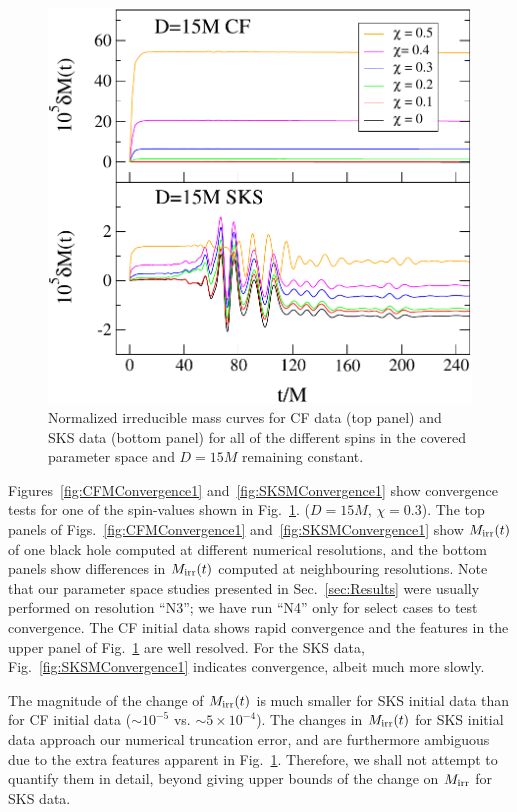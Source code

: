 \begin{figure}
 \includegraphics[width=0.95\columnwidth]{chap5/MassIncreaseCFSKS}
  \caption[Normalized irreducible mass curves for CF and SKS data.]{Normalized irreducible mass curves for CF data (top panel)
    and SKS data (bottom panel) for all of the different spins in the
    covered parameter space and $D=15M$ remaining constant. }
  \label{fig:MassIncreaseCFSKS}
\end{figure}

Figures~\ref{fig:CFMConvergence1} and~\ref{fig:SKSMConvergence1} show
convergence tests for one of the spin-values shown in
Fig.~\ref{fig:MassIncreaseCFSKS}.  ($D=15M$, $\chi=0.3$).  The top
panels of Figs.~\ref{fig:CFMConvergence1}
and~\ref{fig:SKSMConvergence1} show $M_{\rm irr}(t)$ of one black hole
computed at different numerical resolutions, and the bottom panels
show differences in $M_{\rm irr}(t)$ computed at neighbouring
resolutions.  Note that our parameter space studies presented in
Sec.~\ref{sec:Results} were usually performed on resolution ``N3''; we
have run ``N4'' only for select cases to test convergence.  The CF
initial data shows rapid convergence and the features in the upper
panel of Fig.~\ref{fig:MassIncreaseCFSKS} are well resolved.  For the
SKS data, Fig.~\ref{fig:SKSMConvergence1} indicates convergence,
albeit much more slowly.

The magnitude of the change of $M_{\rm irr}(t)$ is much smaller for
SKS initial data than for CF initial data ($\sim 10^{-5}$ vs. $\sim
5\times 10^{-4}$).  The changes in $M_{\rm irr}(t)$ for SKS initial
data approach our numerical truncation error, and are furthermore
ambiguous due to the extra features apparent in
Fig.~\ref{fig:MassIncreaseCFSKS}.  Therefore, we shall not attempt to
quantify them in detail, beyond giving upper bounds of the change on
$M_{\rm irr}$ for SKS data.


